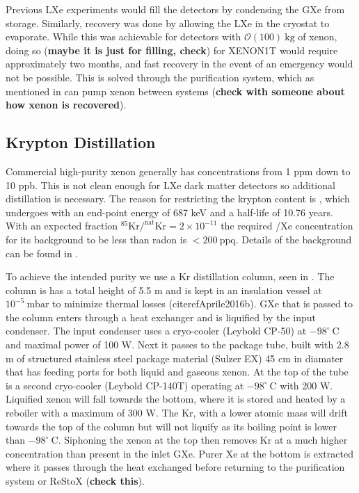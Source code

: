 Previous LXe experiments would fill the detectors by condensing the GXe from storage.  Similarly, recovery was done by allowing the LXe
in the cryostat to evaporate.  While this was achievable for detectors with $\mathcal{O}(100)\ \mathrm{kg}$ of xenon, doing so
(\textbf{maybe it is just for filling, check}) for XENON1T would require approximately two months, and fast recovery in the event of an
emergency would not be possible.  This is solved through the purification system, which as mentioned in  can
pump xenon between systems (\textbf{check with someone about how xenon is recovered}).



\subsection{Krypton Distillation}
\label{subsec:xenon1t_kr_dist}
Commercial high-purity xenon generally has  concentrations from 1 ppm down to 10 ppb.  This is not clean enough for LXe dark matter
detectors so additional distillation is necessary.  The reason for restricting the
krypton content is , which undergoes \betadecay with an end-point energy of 687 keV and a half-life of 10.76 years.  With
an expected fraction $\mathrm{^{85}Kr / ^{nat}Kr = 2 \times 10^{-11}}$ the required /Xe concentration for its background to be
less than radon is $< 200\ \mathrm{ppq}$.  Details of the  background can be found in .

To achieve the intended purity we use a Kr distillation column, seen in .  The column is has a total
height of 5.5 m and is kept in an insulation vessel at $10^{-5}\ \mathrm{mbar}$ to minimize thermal losses (citeref{Aprile2016b}).  GXe
that is passed to the column enters through a heat exchanger and is
liquified by the input condenser.  The input condenser uses a cryo-cooler (Leybold CP-50) at $-98^{\circ}\ \mathrm{C}$ and maximal power
of 100 W.  Next it passes to the package tube, built with 2.8 m of structured stainless steel package material (Sulzer EX) 45 cm in
diamater that has feeding ports for both liquid and gaseous xenon.  At the top of the tube is a second cryo-cooler (Leybold CP-140T)
operating at $-98^{\circ}\ \mathrm{C}$ with 200 W.  Liquified xenon will fall towards the bottom, where it is stored and heated by a
reboiler with a maximum of 300 W.  The Kr, with a lower atomic mass will drift towards the top of the column but will not liquify as its
boiling point is lower than $-98^{\circ}\ \mathrm{C}$.  Siphoning the xenon at the top then removes Kr at a much higher concentration than
present in the inlet GXe.  Purer Xe at the bottom is extracted where it passes through the heat exchanged before returning to the
purification system or ReStoX (\textbf{check this}).

